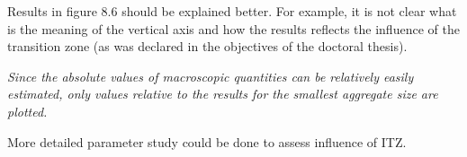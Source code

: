 \documentclass[%
]{phdpresentation}
\begin{document}
\begin{discussion}
\begin{questionframe}{6}
	\begin{questionblock}
		Results in figure 8.6 should be explained better.
		For example, it is not clear what is the meaning of the vertical axis and how the results reflects the influence of the transition zone (as was declared in the objectives of the doctoral thesis).
	\end{questionblock}
	\begin{answerblock}
		\begin{myitemize}
			\item \textit{Since the absolute values of macroscopic quantities can be relatively easily estimated, only values relative to the results for the smallest aggregate size are plotted.}
			\item More detailed parameter study could be done to assess influence of ITZ.
		\end{myitemize}
	\end{answerblock}
\end{questionframe}

\end{discussion}
\end{document}
